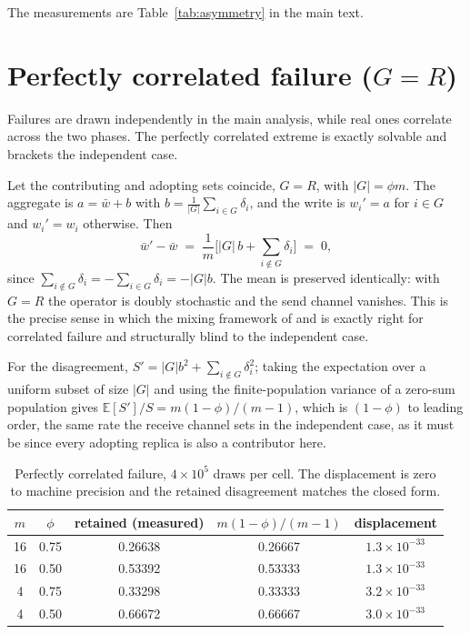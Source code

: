 \documentclass{article}
\theoremstyle{plain}
\newcommand{\E}{\mathbb{E}}
\begin{document}
The measurements are Table~\ref{tab:asymmetry} in the main text.

\section{Perfectly correlated failure ($G=R$)}\label{app:correlated}

Failures are drawn independently in the main analysis, while real ones correlate
across the two phases. The perfectly correlated extreme is exactly solvable and
brackets the independent case.

Let the contributing and adopting sets coincide, $G=R$, with $|G|=\phi m$. The
aggregate is $a=\bar w+b$ with $b=\frac{1}{|G|}\sum_{i\in G}\delta_i$, and the
write is $w_i'=a$ for $i\in G$ and $w_i'=w_i$ otherwise. Then
\[
\bar w' - \bar w \;=\; \frac{1}{m}\Big[|G|\,b + \!\!\sum_{i\notin G}\!\delta_i\Big] \;=\; 0,
\]
since $\sum_{i\notin G}\delta_i = -\sum_{i\in G}\delta_i = -|G|b$. The mean is
preserved identically: with $G=R$ the operator is doubly stochastic and the send
channel vanishes. This is the precise sense in which the mixing framework of
\citet{koloskova2020unified} and \citet{hewa2026factored} is exactly right for
correlated failure and structurally blind to the independent case.

For the disagreement, $S'=|G|b^2+\sum_{i\notin G}\delta_i^2$; taking the
expectation over a uniform subset of size $|G|$ and using the finite-population
variance of a zero-sum population gives $\E[S']/S = m(1-\phi)/(m-1)$, which is
$(1-\phi)$ to leading order, the same rate the receive channel sets in the
independent case, as it must be since every adopting replica is also a
contributor here.

\begin{table}[h]
\centering\small
\caption{Perfectly correlated failure, $4\times10^{5}$ draws per cell. The
displacement is zero to machine precision and the retained disagreement matches
the closed form.}
\label{tab:correlated}
\begin{tabular}{ccccc}
\toprule
$m$ & $\phi$ & retained (measured) & $m(1-\phi)/(m-1)$ & displacement \\
\midrule
16 & 0.75 & 0.26638 & 0.26667 & $1.3\times10^{-33}$ \\
16 & 0.50 & 0.53392 & 0.53333 & $1.3\times10^{-33}$ \\
 4 & 0.75 & 0.33298 & 0.33333 & $3.2\times10^{-33}$ \\
 4 & 0.50 & 0.66672 & 0.66667 & $3.0\times10^{-33}$ \\
\bottomrule
\end{tabular}
\end{table}
\end{document}
